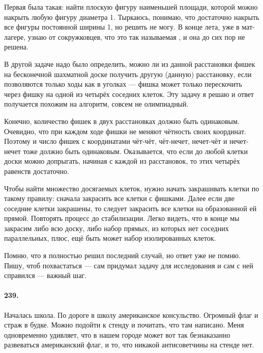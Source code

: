 \documentclass{book}
\begin{document}
Первая была такая: найти плоскую фигуру наименьшей площади,
которой можно накрыть любую фигуру диаметра 1.
Тыркаюсь, понимаю, что достаточно накрыть все фигуры постоянной ширины 1, но решить не могу.
В конце лета, уже в мат-лагере, узнаю от сокружковцев,
что это так называемая , и она до сих пор не решена.

В другой задаче надо было определить, можно ли из данной расстановки фишек на бесконечной шахматной доске 
получить другую (данную) расстановку, если позволяются только ходы как в уголках 
--- фишка может только перескочить через фишку на одной из четырёх соседних клеток.
Эту задачу я решаю и ответ получается похожим на алгоритм, 
совсем не олимпиадный.

Конечно, количество фишек в двух расстановках должно быть одинаковым.
Очевидно, что при каждом ходе фишки не меняют чётность своих координат.
Поэтому и число фишек с координатами чёт-чёт, чёт-нечет, нечет-чёт и нечет-нечет тоже должно быть одинаковым.
Оказывается, что если до любой клетки доски можно допрыгать, начиная с каждой из расстановок, то этих четырёх равенств достаточно.

Чтобы найти множество досягаемых клеток, нужно начать закрашивать клетки по такому правилу:
сначала закрасить все клетки с фишками.
Далее если две соседние клетки закрашены, то следует закрасить все клетки на образованной ей прямой.
Повторять процесс до стабилизации.
Легко видеть, что в конце мы закрасим либо всю доску,
либо набор прямых, из которых нет соседних параллельных, плюс, ещё быть может набор изолированных клеток.

Помню, что я полностью решил последний случай, но ответ уже не помню.
Пишу, чтоб похвастаться --- сам придумал задачу для исследования и сам с ней справился --- важный шаг.


\paragraph{239.}
Началась школа.
По дороге в школу американское консульство.
Огромный флаг и страж в будке.
Можно подойти к стенду и почитать, что там написано.
Меня одновременно удивляет, что в нашем городе может вот так безнаказанно развеваться американский флаг,
и то, что никакой антисоветчины на стенде нет.
\end{document}
